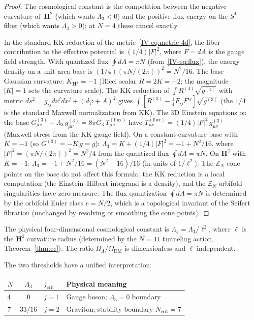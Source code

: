 \begin{proof}
The cosmological constant is the competition between the
negative curvature of~$\mathbf{H}^2$ (which wants $\Lambda_3 < 0$)
and the positive flux energy on the $S^1$ fiber
(which wants $\Lambda_3 > 0$); at $N = 4$ these cancel exactly.

In the standard KK reduction of the metric~\eqref{IV-eq:metric-4d},
the fiber contribution to the effective potential is
$(1/4)|F|^2$, where $F = dA$ is the gauge field strength.
With quantized flux $\oint dA = \pi N$
(from~\eqref{IV-eq:flux}), the energy density on a unit-area
base is $(1/4)(\pi N / (2\pi))^2 = N^2/16$.
The base Gaussian curvature: $K_{\mathbf{H}^2} = -1$
(Ricci scalar $R = 2K = -2$; the magnitude $|K| = 1$ sets
the curvature scale).
The KK reduction of $\int R^{(4)}\sqrt{g^{(4)}}$
with metric $ds^2 = g_{ij}dx^idx^j + (d\varphi{+}A)^2$
gives $\int[R^{(3)} - \tfrac{1}{4}F_{ij}F^{ij}]\sqrt{g^{(3)}}$
(the $1/4$ is the standard Maxwell normalization from KK).
The 3D Einstein equations on the base
$G_{\mu\nu}^{(3)} + \Lambda_3\,g_{\mu\nu}^{(3)}
= 8\pi G_3\,T_{\mu\nu}^{(\mathrm{flux})}$
have $T_{\mu\nu}^{(\mathrm{flux})}
= (1/4)|F|^2\,g_{\mu\nu}^{(3)}$ (Maxwell stress from the
KK gauge field).
On a constant-curvature base with $K = -1$
(so $G^{(3)} = -K\,g = g$):
$\Lambda_3 = K + (1/4)|F|^2 = -1 + N^2/16$,
where $|F|^2 = (\pi N/(2\pi))^2 = N^2/4$ from the
quantized flux $\oint\!dA = \pi N$.
On $\mathbf{H}^2$ with $K = -1$:
$\Lambda_3 = -1 + N^2/16 = (N^2 - 16)/16$
(in units of $1/\ell^2$).
The $\mathbb{Z}_N$ cone points on the base do not
affect this formula: the KK reduction is a local
computation (the Einstein--Hilbert integrand is a
density), and the $\mathbb{Z}_N$ orbifold singularities
have zero measure.
The flux quantization $\oint dA = \pi N$ is
determined by the orbifold Euler class $e = N/2$,
which is a topological invariant of the Seifert
fibration (unchanged by resolving or smoothing the
cone points).
\end{proof}

\noindent
The physical four-dimensional cosmological constant is
$\Lambda_4 = \Lambda_3/\ell^2$,
where $\ell$ is the $\mathbf{H}^2$ curvature radius
(determined by the $N = 11$ tunneling action,
Theorem~\ref{thm:cc}).
The ratio $\Omega_\Lambda/\Omega_{\mathrm{DM}}$ is
dimensionless and $\ell$-independent.

\noindent
The two thresholds have a unified interpretation:
\begin{center}
\small
\begin{tabular}{lcll}
\toprule
$N$ & $\Lambda_3$ & $j_{\mathrm{crit}}$ & Physical meaning \\
\midrule
$4$ & $0$ & $j = 1$ & Gauge boson; $\Lambda_3 = 0$ boundary \\
$7$ & $33/16$ & $j = 2$ & Graviton; stability boundary $N_{\mathrm{crit}} = 7$ \\
\bottomrule
\end{tabular}
\end{center}


